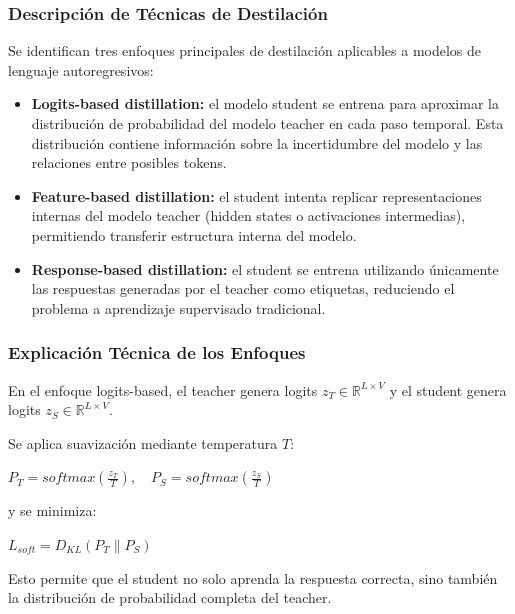 \documentclass[12pt]{article}
\begin{document}
	\subsubsection{Descripción de Técnicas de Destilación}
	
	Se identifican tres enfoques principales de destilación aplicables a modelos de lenguaje autoregresivos:
	
	\begin{itemize}
		\item \textbf{Logits-based distillation:} el modelo student se entrena para aproximar la distribución de probabilidad del modelo teacher en cada paso temporal. Esta distribución contiene información sobre la incertidumbre del modelo y las relaciones entre posibles tokens.
		
		\item \textbf{Feature-based distillation:} el student intenta replicar representaciones internas del modelo teacher (hidden states o activaciones intermedias), permitiendo transferir estructura interna del modelo.
		
		\item \textbf{Response-based distillation:} el student se entrena utilizando únicamente las respuestas generadas por el teacher como etiquetas, reduciendo el problema a aprendizaje supervisado tradicional.
	\end{itemize}
	

	
	\subsubsection{Explicación Técnica de los Enfoques}
	
	En el enfoque logits-based, el teacher genera logits $z_T \in \mathbb{R}^{L \times V}$ y el student genera logits $z_S \in \mathbb{R}^{L \times V}$.
	
	Se aplica suavización mediante temperatura $T$:
	
	\begin{center}
		$P_T = softmax(\frac{z_T}{T}), \quad P_S = softmax(\frac{z_S}{T})$
	\end{center}
	
	y se minimiza:
	
	\begin{center}
		$L_{soft} = D_{KL}(P_T \parallel P_S)$
	\end{center}
	
	Esto permite que el student no solo aprenda la respuesta correcta, sino también la distribución de probabilidad completa del teacher.
	
\end{document}

